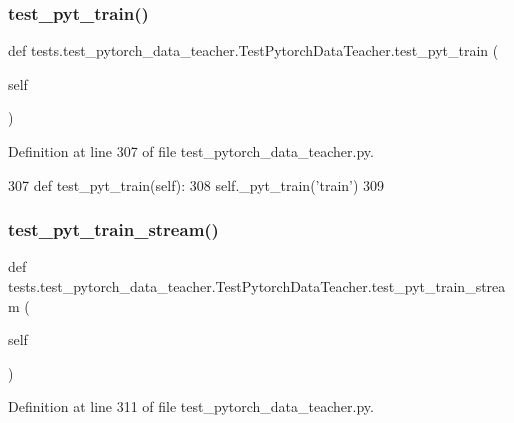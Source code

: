 \subsubsection{\texorpdfstring{test\+\_\+pyt\+\_\+train()}{test\_pyt\_train()}}
{\footnotesize\ttfamily def tests.\+test\+\_\+pytorch\+\_\+data\+\_\+teacher.\+Test\+Pytorch\+Data\+Teacher.\+test\+\_\+pyt\+\_\+train (\begin{DoxyParamCaption}\item[{}]{self }\end{DoxyParamCaption})}



Definition at line 307 of file test\+\_\+pytorch\+\_\+data\+\_\+teacher.\+py.


\begin{DoxyCode}
307     \textcolor{keyword}{def }test\_pyt\_train(self):
308         self.\_pyt\_train(\textcolor{stringliteral}{'train'})
309 
\end{DoxyCode}
\mbox{\label{classtests_1_1test__pytorch__data__teacher_1_1TestPytorchDataTeacher_a3d14342d0d8a931821b223111e383d8e}} 
\subsubsection{\texorpdfstring{test\+\_\+pyt\+\_\+train\+\_\+stream()}{test\_pyt\_train\_stream()}}
{\footnotesize\ttfamily def tests.\+test\+\_\+pytorch\+\_\+data\+\_\+teacher.\+Test\+Pytorch\+Data\+Teacher.\+test\+\_\+pyt\+\_\+train\+\_\+stream (\begin{DoxyParamCaption}\item[{}]{self }\end{DoxyParamCaption})}



Definition at line 311 of file test\+\_\+pytorch\+\_\+data\+\_\+teacher.\+py.


